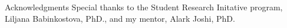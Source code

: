 \begin{block}{\Large Acknowledgments}
Special thanks to the Student Research Initative program, Liljana
Babinkostova, PhD., and my mentor, Alark Joshi, PhD.
\end{block}
